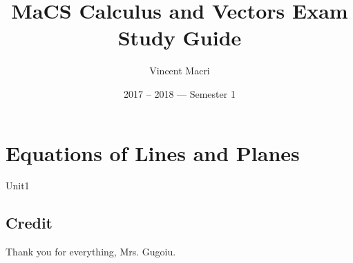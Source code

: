 \documentclass[letterpaper,12pt]{report}
\title{MaCS Calculus and Vectors Exam Study Guide}
\author{Vincent Macri}
\date{2017 -- 2018 --- Semester 1}
\begin{document}
	\maketitle
	\clearpage
	\tableofcontents
	\clearpage

	\part{Equations of Lines and Planes}
		{Unit1}
	
	\appendix
	\chapter{Credit}
	Thank you for everything, Mrs. Gugoiu.
\end{document}
